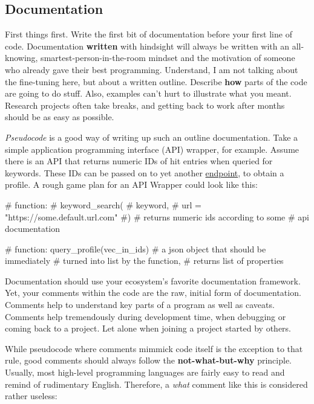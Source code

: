 \documentclass[
  12pt,
  letterpaper,
]{krantz}
\newenvironment{Shaded}{\begin{snugshade}}{\end{snugshade}}
\newcommand{\CommentTok}[1]{\textcolor[rgb]{0.37,0.37,0.37}{#1}}
\begin{document}
\hypertarget{documentation}{%
\subsection{Documentation}\label{documentation}}

First things first. Write the first bit of documentation before your
first line of code. Documentation \textbf{written} with hindsight will
always be written with an all-knowing, smartest-person-in-the-room
mindset and the motivation of someone who already gave their best
programming. Understand, I am not talking about the fine-tuning here,
but about a written outline. Describe \textbf{how} parts of the code are
going to do stuff. Also, examples can't hurt to illustrate what you
meant. Research projects often take breaks, and getting back to work
after months should be as easy as possible.

\emph{Pseudocode} is a good way of writing up such an outline
documentation. Take a simple application programming interface (API)
wrapper, for example. Assume there is an API that returns numeric IDs of
hit entries when queried for keywords. These IDs can be passed on to yet
another \protect\hyperlink{glossary--}{endpoint}, to obtain a profile. A
rough game plan for an API Wrapper could look like this:

\begin{Shaded}
\begin{Highlighting}[]

\CommentTok{\# function: }
\CommentTok{\# keyword\_search(}
\CommentTok{\#  keyword,}
\CommentTok{\#  url = "https://some.default.url.com"}
\CommentTok{\#)}
\CommentTok{\# returns numeric ids according to some}
\CommentTok{\# api documentation}

\CommentTok{\# function: query\_profile(vec\_in\_ids)}
\CommentTok{\# a json object that should be immediately}
\CommentTok{\# turned into list by the function, }
\CommentTok{\# returns list of properties}
\end{Highlighting}
\end{Shaded}

Documentation should use your ecosystem's favorite documentation
framework. Yet, your comments within the code are the raw, initial form
of documentation. Comments help to understand key parts of a program as
well as caveats. Comments help tremendously during development time,
when debugging or coming back to a project. Let alone when joining a
project started by others.

While pseudocode where comments mimmick code itself is the exception to
that rule, good comments should always follow the
\textbf{not-what-but-why} principle. Usually, most high-level
programming languages are fairly easy to read and remind of rudimentary
English. Therefore, a \emph{what} comment like this is considered rather
useless:
\end{document}
